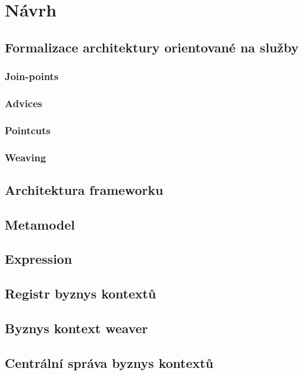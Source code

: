\usepackage[T1]{fontenc}
\usepackage[utf8]{inputenc}


\chapter{Návrh}\label{ch:navrh}

\section{Formalizace architektury orientované na služby}

\subsection{Join-points}

\subsection{Advices}

\subsection{Pointcuts}

\subsection{Weaving}

\section{Architektura frameworku}

\section{Metamodel}

\section{Expression}

\section{Registr byznys kontextů}

\section{Byznys kontext weaver}

\section{Centrální správa byznys kontextů}

